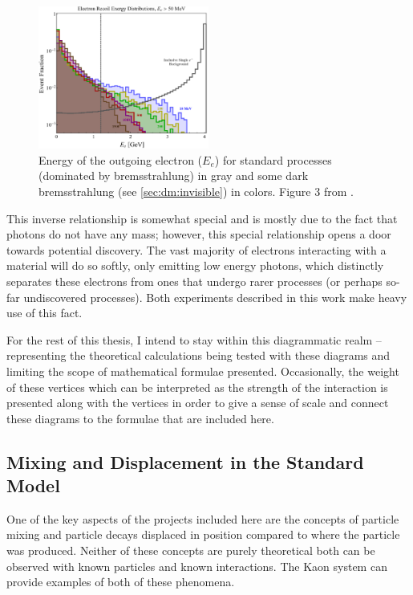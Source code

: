 \begin{figure}
  \centering
  \includegraphics[width=0.5\textwidth]{figures/intro/photon-reject-fig-3-recoil-electron-energy.png}
  \caption{
    Energy of the outgoing electron ($E_e$) for standard processes (dominated by bremsstrahlung)
    in gray and some dark bremsstrahlung (see \cref{sec:dm:invisible}) in colors.
    Figure 3 from \cite{ldmx-photon-reject-2020}.
  }
  \label{fig:recoil-electron-energy}
\end{figure}

This inverse relationship is somewhat special and is mostly due to the fact that photons
do not have any mass; however, this special relationship opens a door towards potential
discovery. The vast majority of electrons interacting with a material will do so softly,
only emitting low energy photons, which distinctly separates these electrons from ones
that undergo rarer processes (or perhaps so-far undiscovered processes). Both experiments
described in this work make heavy use of this fact.

For the rest of this thesis, I intend to stay within this diagrammatic realm -- representing the theoretical
calculations being tested with these diagrams and limiting the scope of mathematical formulae
presented. Occasionally, the weight of these vertices which can be interpreted as the strength
of the interaction is presented along with the vertices in order to give a sense of scale
and connect these diagrams to the formulae that are included here.

\subsection{Mixing and Displacement in the Standard Model}
One of the key aspects of the projects included here are the concepts of particle mixing
and particle decays displaced in position compared to where the particle was produced.
Neither of these concepts are purely theoretical both can be observed with known
particles and known interactions. The Kaon system can provide examples of both of these
phenomena.

